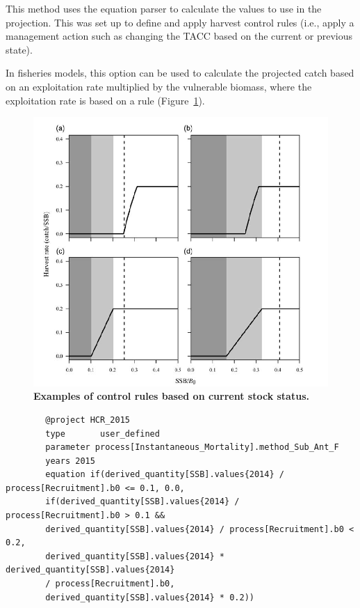 This method uses the equation parser to calculate the values to use in the projection. This was set up to define and apply harvest control rules (i.e., apply a management action such as changing the TACC based on the current or previous state).

In fisheries models, this option can be used to calculate the projected catch based on an exploitation rate multiplied by the vulnerable biomass, where the exploitation rate is based on a rule (Figure~\ref{fig:HCR}).

\begin{figure}[!h]
	\includegraphics[scale=0.9]{Figures/HarvestControlRules.png}
	\caption{\textbf{Examples of control rules based on current stock status.}}
	\label{fig:HCR}
\end{figure}

\pagebreak
{\small{\begin{verbatim}
		@project HCR_2015
		type       user_defined
		parameter process[Instantaneous_Mortality].method_Sub_Ant_F
		years 2015
		equation if(derived_quantity[SSB].values{2014} / process[Recruitment].b0 <= 0.1, 0.0,
		if(derived_quantity[SSB].values{2014} / process[Recruitment].b0 > 0.1 &&
		derived_quantity[SSB].values{2014} / process[Recruitment].b0 < 0.2,
		derived_quantity[SSB].values{2014} * derived_quantity[SSB].values{2014}
		/ process[Recruitment].b0,
		derived_quantity[SSB].values{2014} * 0.2))
		\end{verbatim}}}

